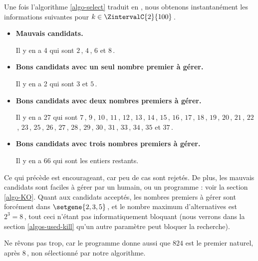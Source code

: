

\medskip

Une fois l'algorithme \ref{algo-select} traduit en \python, nous obtenons instantanément les informations suivantes pour $k \in \ZintervalC{2}{100}$\,.
%
\begin{itemize}
	\item \textbf{Mauvais candidats.}
	
	\noindent
	Il y en a 4 qui sont $2$\,, $4$\,, $6$ et $8$\,.
	
	\item \textbf{Bons candidats avec un seul nombre premier à gérer.}
	
	\noindent
	Il y en a 2 qui sont $3$ et $5$\,.
	
	\item \textbf{Bons candidats avec deux nombres premiers à gérer.}
	
	\noindent
	Il y en a 27 qui sont $7$\,, $9$\,, $10$\,, $11$\,, $12$\,, $13$\,, $14$\,, $15$\,, $16$\,, $17$\,, $18$\,, $19$\,, $20$\,, $21$\,, $22$\,, $23$\,, $25$\,, $26$\,, $27$\,, $28$\,, $29$\,, $30$\,, $31$\,, $33$\,, $34$\,, $35$ et $37$\,.

	\item\textbf{Bons candidats avec trois nombres premiers à gérer.}
	
	\noindent
	Il y en a 66 qui sont les entiers restants.
\end{itemize}


Ce qui précède est encourageant, car peu de cas sont rejetés.
De plus, les mauvais candidats sont faciles à gérer par un humain, ou un programme : voir la section \ref{algo-KO}.
Quant aux candidats acceptés, les nombres premiers à gérer sont forcément dans $\setgene{2, 3, 5}$\,, et le nombre maximum d'alternatives est $2^3 = 8$\,, tout ceci n'étant pas informatiquement bloquant (nous verrons dans la section \ref{algos-used-kill} qu'un autre paramètre peut bloquer la recherche).
 



\begin{remark}
	Ne rêvons pas trop, car le programme donne aussi que $824$ est le premier naturel, après $8$\,, non sélectionné par notre algorithme.
\end{remark}

